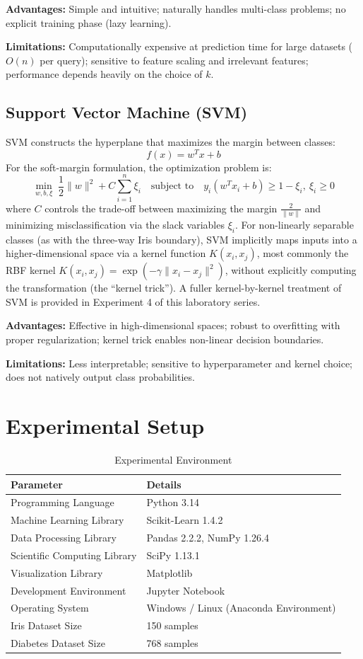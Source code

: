 \documentclass[12pt,a4paper]{article}
\begin{document}
\textbf{Advantages:} Simple and intuitive; naturally handles multi-class problems; no explicit training phase (lazy learning).

\textbf{Limitations:} Computationally expensive at prediction time for large datasets ($O(n)$ per query); sensitive to feature scaling and irrelevant features; performance depends heavily on the choice of $k$.

\subsection{Support Vector Machine (SVM)}

SVM constructs the hyperplane that maximizes the margin between classes:
\[
f(x) = w^Tx + b
\]
For the soft-margin formulation, the optimization problem is:
\[
\min_{w,b,\xi} \; \frac{1}{2}\|w\|^2 + C\sum_{i=1}^{n}\xi_i \quad \text{subject to} \quad y_i(w^Tx_i+b) \geq 1-\xi_i,\ \xi_i \geq 0
\]
where $C$ controls the trade-off between maximizing the margin $\frac{2}{\|w\|}$ and minimizing misclassification via the slack variables $\xi_i$. For non-linearly separable classes (as with the three-way Iris boundary), SVM implicitly maps inputs into a higher-dimensional space via a kernel function $K(x_i, x_j)$, most commonly the RBF kernel $K(x_i,x_j) = \exp(-\gamma\|x_i-x_j\|^2)$, without explicitly computing the transformation (the ``kernel trick''). A fuller kernel-by-kernel treatment of SVM is provided in Experiment 4 of this laboratory series.

\textbf{Advantages:} Effective in high-dimensional spaces; robust to overfitting with proper regularization; kernel trick enables non-linear decision boundaries.

\textbf{Limitations:} Less interpretable; sensitive to hyperparameter and kernel choice; does not natively output class probabilities.

\section{Experimental Setup}

\begin{table}[H]
\centering
\begin{tabular}{ll}
\toprule
Parameter & Details \\
\midrule
Programming Language & Python 3.14 \\
Machine Learning Library & Scikit-Learn 1.4.2 \\
Data Processing Library & Pandas 2.2.2, NumPy 1.26.4 \\
Scientific Computing Library & SciPy 1.13.1 \\
Visualization Library & Matplotlib \\
Development Environment & Jupyter Notebook \\
Operating System & Windows / Linux (Anaconda Environment) \\
Iris Dataset Size & 150 samples \\
Diabetes Dataset Size & 768 samples \\
\bottomrule
\end{tabular}
\caption{Experimental Environment}
\end{table}
\end{document}

